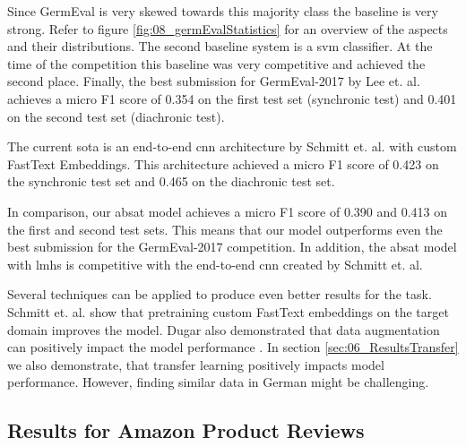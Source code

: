 Since GermEval is very skewed towards this majority class the baseline is very strong. Refer to figure \ref{fig:08_germEvalStatistics} for an overview of the aspects and their distributions. The second baseline system is a \gls{svm} classifier. At the time of the competition this baseline was very competitive and achieved the second place. Finally, the best submission for GermEval-2017 by Lee et. al. achieves a micro F1 score of 0.354 on the first test set {(synchronic test)} and 0.401 on the second test set {(diachronic test)}.
\medskip

The current \acrfull{sota} is an end-to-end \gls{cnn} architecture by Schmitt et. al. \cite{Schmitt2018} with custom FastText Embeddings. This architecture achieved a micro F1 score of 0.423 on the synchronic test set and 0.465 on the diachronic test set. 
\medskip

In comparison, our \gls{absat} model achieves a micro F1 score of 0.390 and 0.413 on the first and second test sets. This means that our model outperforms even the best submission for the GermEval-2017 competition. In addition, the \gls{absat} model with \glspl{lmh} is competitive with the end-to-end \gls{cnn} created by Schmitt et. al.
\medskip

Several techniques can be applied to produce even better results for the task. Schmitt et. al. show that pretraining custom FastText embeddings on the target domain improves the model. Dugar also demonstrated that data augmentation can positively impact the model performance \cite{Dugar2019}. 
\smallskip
In section \ref{sec:06_ResultsTransfer} we also demonstrate, that transfer learning positively impacts model performance. However, finding similar data in German might be challenging.

\subsection{Results for Amazon Product Reviews}
\label{sec:06_ResultsAmazon}

